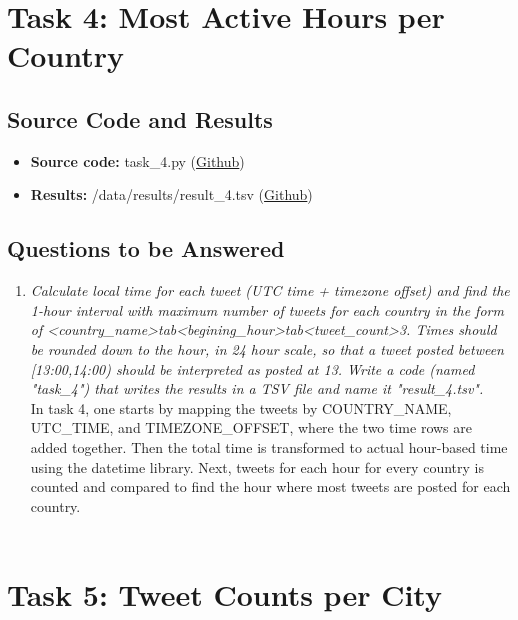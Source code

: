 \documentclass{article}
\begin{document}
\section*{Task 4: Most Active Hours per Country}
\subsection*{Source Code and Results}
    \begin{itemize}
        \item \textbf{Source code:} task\_4.py (\href{https://github.com/FredrikBakken/TDT4305_Big-Data-Project/blob/master/PhaseOne/task_4.py}{Github})
        \item \textbf{Results:} /data/results/result\_4.tsv (\href{https://github.com/FredrikBakken/TDT4305_Big-Data-Project/blob/master/PhaseOne/data/results/result_4.tsv/part-00000}{Github})
    \end{itemize}

\subsection*{Questions to be Answered}
\begin{enumerate}[label=\alph*)]
    \item \textit{Calculate local time for each tweet (UTC time + timezone offset) and find the 1-hour interval with maximum number of tweets for each country in the form of \textless country\_name\textgreater tab\textless begining\_hour\textgreater tab\textless tweet\_count\textgreater 3. Times should be rounded down to the hour, in 24 hour scale, so that a tweet posted between [13:00,14:00) should be interpreted as posted at 13. Write a code (named "task\_4") that writes the results in a TSV file and name it "result\_4.tsv".}\\
    
    In task 4, one starts by mapping the tweets by COUNTRY\_NAME, UTC\_TIME, and TIMEZONE\_OFFSET, where the two time rows are added together. Then the total time is transformed to actual hour-based time using the datetime library. Next, tweets for each hour for every country is counted and compared to find the hour where most tweets are posted for each country.\\ \\
\end{enumerate}


\section*{Task 5: Tweet Counts per City}
\end{document}
